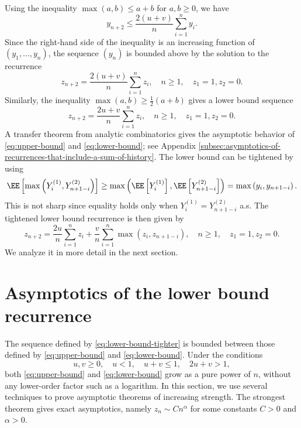 Using the inequality $\max(a,b) \le a + b$ for $a,b \ge 0$, we have
$$y_{n+2} \le \dfrac{2(u+v)}{n}\sum\limits_{i=1}^n y_{i}.$$
Since the right-hand side of the inequality is an increasing function of $(y_1, \ldots, y_n)$, the sequence $(y_n)$ is bounded above by the solution to the recurrence
\begin{equation}
  \label{eq:upper-bound}
  z_{n+2} = \dfrac{2(u+v)}{n}\sum\limits_{i=1}^n z_{i}, \quad n \ge 1, \quad z_1 = 1, z_2 = 0.
\end{equation}
Similarly, the inequality $\max(a,b) \ge \frac{1}{2}(a+b)$ gives a lower bound sequence
\begin{equation}
  \label{eq:lower-bound}
  z_{n+2} = \dfrac{2u+v}{n}\sum\limits_{i=1}^n z_{i}, \quad n \ge 1, \quad z_1 = 1, z_2 = 0.
\end{equation}
A transfer theorem from analytic combinatorics gives the asymptotic behavior of \eqref{eq:upper-bound} and \eqref{eq:lower-bound}; see Appendix \ref{subsec:asymptotics-of-recurrences-that-include-a-sum-of-history}. The lower bound can be tightened by using
$$\EE\left[\max\left(Y_{i}^{(1)}, Y_{n+1-i}^{(2)}\right)\right] \ge \max\left(\EE\left[Y_{i}^{(1)}\right], \EE\left[Y_{n+1-i}^{(2)}\right]\right) = \max\left(y_i, y_{n+1-i}\right).$$
This is not sharp since equality holds only when $Y_{i}^{(1)} = Y_{n+1-i}^{(2)}$ a.s. The tightened lower bound recurrence is then given by
\begin{equation}
  \label{eq:lower-bound-tighter}
  z_{n+2} = \dfrac{2u}{n}\sum\limits_{i=1}^n z_{i} + \dfrac{v}{n}\sum\limits_{i=1}^n \max\left(z_i, z_{n+1-i}\right), \quad n \ge 1, \quad z_1 = 1, z_2 = 0.
\end{equation}
We analyze it in more detail in the next section.

\section{Asymptotics of the lower bound recurrence}

The sequence defined by \eqref{eq:lower-bound-tighter} is bounded between those defined by \eqref{eq:upper-bound} and \eqref{eq:lower-bound}. Under the conditions
\begin{equation}
  \label{eq:parameter-conditions}
  u,v \ge 0, \quad u < 1, \quad u+v\le1, \quad 2u+v > 1,
\end{equation}
both \eqref{eq:upper-bound} and \eqref{eq:lower-bound} grow as a pure power of $n$, without any lower-order factor such as a logarithm. In this section, we use several techniques to prove asymptotic theorems of increasing strength. The strongest theorem gives exact asymptotics, namely $z_n\sim Cn^{\alpha}$ for some constants $C > 0$ and $\alpha > 0$.

